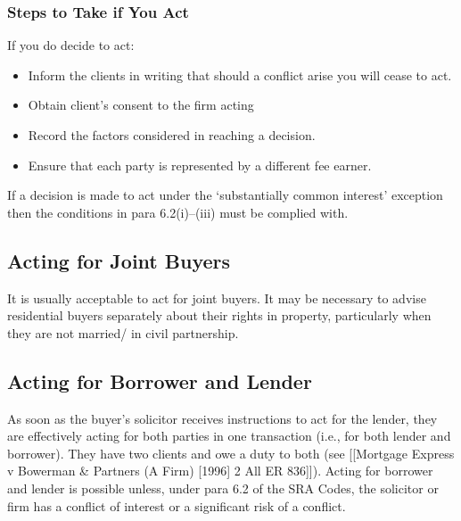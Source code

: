\documentclass[
]{article}
\providecommand{\tightlist}{%
  \setlength{\itemsep}{0pt}\setlength{\parskip}{0pt}}
\begin{document}
\hypertarget{steps-to-take-if-you-act}{%
\subsubsection{Steps to Take if You
Act}\label{steps-to-take-if-you-act}}

If you do decide to act:

\begin{itemize}
\tightlist
\item
  Inform the clients in writing that should a conflict arise you will
  cease to act.
\item
  Obtain client's consent to the firm acting
\item
  Record the factors considered in reaching a decision.
\item
  Ensure that each party is represented by a different fee earner.
\end{itemize}

If a decision is made to act under the `substantially common interest'
exception then the conditions in para 6.2(i)--(iii) must be complied
with.

\hypertarget{acting-for-joint-buyers}{%
\subsection{Acting for Joint Buyers}\label{acting-for-joint-buyers}}

It is usually acceptable to act for joint buyers. It may be necessary to
advise residential buyers separately about their rights in property,
particularly when they are not married/ in civil partnership.

\hypertarget{acting-for-borrower-and-lender}{%
\subsection{Acting for Borrower and
Lender}\label{acting-for-borrower-and-lender}}

As soon as the buyer's solicitor receives instructions to act for the
lender, they are effectively acting for both parties in one transaction
(i.e., for both lender and borrower). They have two clients and owe a
duty to both (see {[}{[}Mortgage Express v Bowerman \& Partners (A Firm)
{[}1996{]} 2 All ER 836{]}{]}). Acting for borrower and lender is
possible unless, under para 6.2 of the SRA Codes, the solicitor or firm
has a conflict of interest or a significant risk of a conflict.
\end{document}
